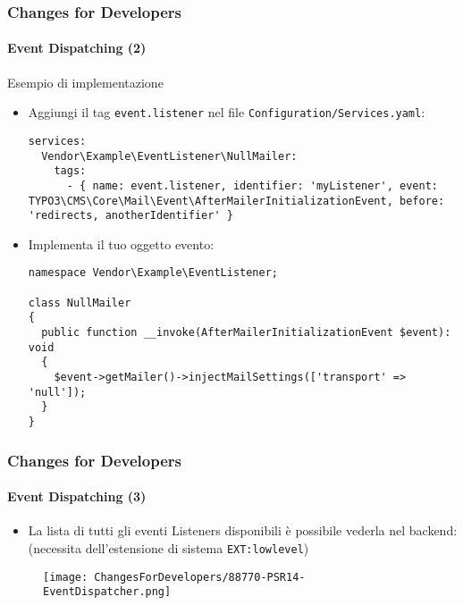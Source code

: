 \begin{frame}[fragile]
	\frametitle{Changes for Developers}
	\framesubtitle{Event Dispatching (2)}

	\lstset{basicstyle=\tiny\ttfamily}

	Esempio di implementazione

	\begin{itemize}\smaller
		\item[\ding{202}] Aggiungi il tag \texttt{event.listener} nel file \texttt{Configuration/Services.yaml}:

\begin{lstlisting}
services:
  Vendor\Example\EventListener\NullMailer:
    tags:
      - { name: event.listener, identifier: 'myListener', event: TYPO3\CMS\Core\Mail\Event\AfterMailerInitializationEvent, before: 'redirects, anotherIdentifier' }
\end{lstlisting}

		\item[\ding{203}] Implementa il tuo oggetto evento:

\begin{lstlisting}
namespace Vendor\Example\EventListener;

class NullMailer
{
  public function __invoke(AfterMailerInitializationEvent $event): void
  {
    $event->getMailer()->injectMailSettings(['transport' => 'null']);
  }
}
\end{lstlisting}

	\end{itemize}\normalsize

\end{frame}


\begin{frame}[fragile]
	\frametitle{Changes for Developers}
	\framesubtitle{Event Dispatching (3)}

	\lstset{basicstyle=\tiny\ttfamily}

	\begin{itemize}
		\item La lista di tutti gli eventi Listeners disponibili è possibile vederla nel backend:\newline
			\smaller
				(necessita dell'estensione di sistema \texttt{EXT:lowlevel})
			\normalsize
	\end{itemize}

	\begin{figure}
		\texttt{[image: ChangesForDevelopers/88770-PSR14-EventDispatcher.png]}
	\end{figure}

\end{frame}


